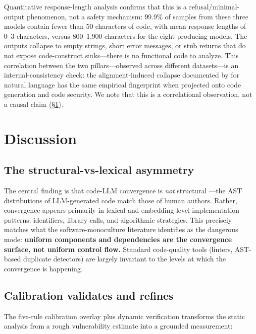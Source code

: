 \documentclass{article}
\begin{document}
Quantitative response-length analysis confirms that this is a
refusal/minimal-output phenomenon, not a safety mechanism: 99.9\% of
samples from these three models contain fewer than 50 characters of code,
with mean response lengths of 0--3 characters, versus 800--1,900 characters
for the eight producing models. The outputs collapse to empty strings,
short error messages, or stub returns that do not expose code-construct
sinks---there is no functional code to analyze. This correlation between
the two pillars---observed across different datasets---is an
internal-consistency check: the alignment-induced collapse documented by
\citet{jiang2025hivemind} for natural language has the same empirical
fingerprint when projected onto code generation and code security. We note
that this is a correlational observation, not a causal claim
(\S\ref{sec:discussion}).

\section{Discussion}
\label{sec:discussion}

\subsection{The structural-vs-lexical asymmetry}

The central finding is that code-LLM convergence is \emph{not} structural
---the AST distributions of LLM-generated code match those of human
authors. Rather, convergence appears primarily in lexical and
embedding-level implementation patterns: identifiers, library calls, and
algorithmic strategies. This precisely matches what the
software-monoculture literature identifies as the dangerous mode:
\textbf{uniform components and dependencies are the convergence surface,
not uniform control flow.} Standard code-quality tools (linters, AST-based
duplicate detectors) are largely invariant to the levels at which the
convergence is happening.

\subsection{Calibration validates and refines}

The five-rule calibration overlay plus dynamic verification transforms the
static analysis from a rough vulnerability estimate into a grounded
measurement:
\end{document}
